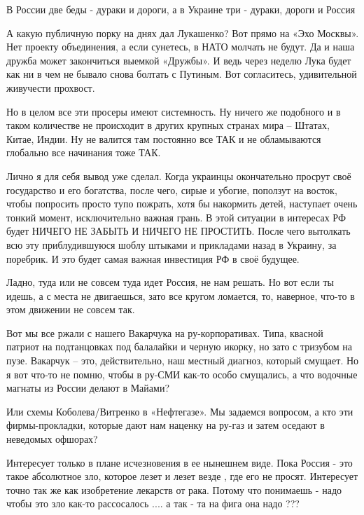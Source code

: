\begin{cmtfront}

В России две беды - дураки и дороги, а в Украине три - дураки, дороги и Россия
	
\end{cmtfront}

А какую публичную порку на днях дал Лукашенко? Вот прямо на «Эхо Москвы». Нет
проекту объединения, а если сунетесь, в НАТО молчать не будут. Да и наша дружба
может закончиться выемкой «Дружбы». И ведь через неделю Лука будет как ни в чем
не бывало снова болтать с Путиным. Вот согласитесь, удивительной живучести
прохвост.

Но в целом все эти просеры имеют системность. Ну ничего же подобного и в таком
количестве не происходит в других крупных странах мира – Штатах, Китае, Индии.
Ну не валится там постоянно все ТАК и не обламываются глобально все начинания
тоже ТАК.

\begin{cmtfront}

Лично я для себя вывод уже сделал. Когда украинцы окончательно просрут своё
государство и его богатства, после чего, сирые и убогие, поползут на восток,
чтобы попросить просто тупо пожрать, хотя бы накормить детей, наступает очень
тонкий момент, исключительно важная грань. В этой ситуации в интересах РФ будет
НИЧЕГО НЕ ЗАБЫТЬ И НИЧЕГО НЕ ПРОСТИТЬ. После чего вытолкать всю эту
приблудившуюся шоблу штыками и прикладами назад в Украину, за поребрик. И это
будет самая важная инвестиция РФ в своё будущее.
	
\end{cmtfront}

Ладно, туда или не совсем туда идет Россия, не нам решать. Но вот если ты
идешь, а с места не двигаешься, зато все кругом ломается, то, наверное, что-то
в этом движении не совсем так.

Вот мы все ржали с нашего Вакарчука на ру-корпоративах. Типа, квасной патриот
на подтанцовках под балалайки и черную икорку, но зато с тризубом на пузе.
Вакарчук – это, действительно, наш местный диагноз, который смущает. Но я вот
что-то не помню, чтобы в ру-СМИ как-то особо смущались, а что водочные магнаты
из России делают в Майами?

Или схемы Коболева/Витренко в «Нефтегазе». Мы задаемся вопросом, а кто эти
фирмы-прокладки, которые дают нам наценку на ру-газ и затем оседают в неведомых
офшорах?

\begin{cmtfront}

Интересует только в плане исчезновения в ее нынешнем виде. Пока Россия - это
такое абсолютное зло, которое лезет и лезет везде , где его не просят.
Интересует точно так же как изобретение лекарств от рака. Потому что понимаешь
- надо чтобы это зло как-то рассосалось .... а так - та на фига она надо ???
\end{cmtfront}

